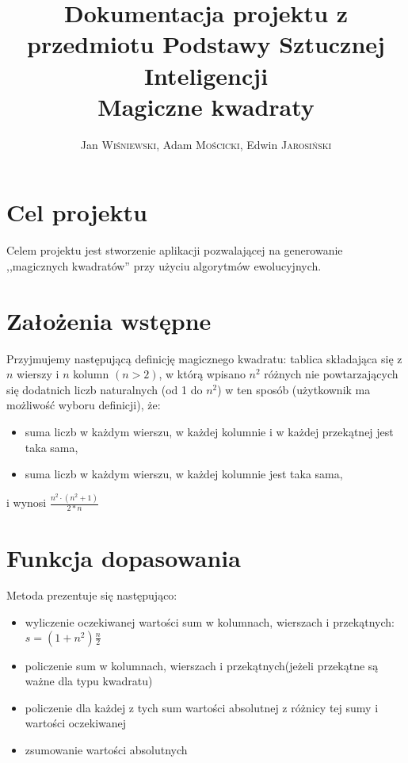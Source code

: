 \documentclass[a4paper,twoside,10pt]{article}
\author{Jan \textsc{Wiśniewski}, Adam \textsc{Mościcki}, Edwin \textsc{Jarosiński}}
\title{Dokumentacja projektu z przedmiotu Podstawy Sztucznej Inteligencji
\\ \vspace{2 mm} {\large Magiczne kwadraty}}
\begin{document}
\maketitle
 
\section{Cel projektu}
	Celem projektu jest stworzenie aplikacji pozwalającej na generowanie ,,magicznych kwadratów'' przy użyciu algorytmów ewolucyjnych.
\section{Założenia wstępne}
	Przyjmujemy następującą definicję magicznego kwadratu:
 tablica składająca się z $ n $ wierszy i $ n $ kolumn $ (n>2) $, w którą wpisano $ n^2 $ różnych nie powtarzających się dodatnich liczb naturalnych (od 1 do $n^2$) w ten sposób (użytkownik ma możliwość wyboru definicji), że:
 \begin{itemize}
  \item suma liczb w każdym wierszu, w każdej kolumnie i w każdej przekątnej jest taka sama,
  \item suma liczb w każdym wierszu, w każdej kolumnie jest taka sama,
 \end{itemize}
 i wynosi $\frac{n^2\cdot(n^2+1)}{2*n}$
\section{Funkcja dopasowania}
Metoda prezentuje się następująco:
		\begin{itemize}
		\item wyliczenie oczekiwanej wartości sum w kolumnach, wierszach i przekątnych: $ s = (1 + n^2) \frac{n}{2} $
		\item policzenie sum w kolumnach, wierszach i przekątnych(jeżeli przekątne są ważne dla typu kwadratu)
		\item policzenie dla każdej z tych sum wartości absolutnej z różnicy tej sumy i wartości oczekiwanej
		\item zsumowanie wartości absolutnych
	\end{itemize}
\end{document}
